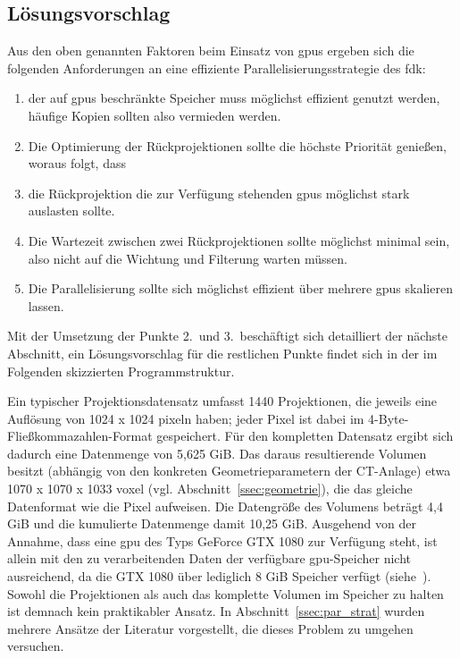 \subsection{Lösungsvorschlag}\label{ssec:loesungsvorschlag}

Aus den oben genannten Faktoren beim Einsatz von \gls{gpu}s ergeben sich die folgenden Anforderungen an eine effiziente
Parallelisierungsstrategie des \gls{fdk}:

\begin{enumerate}
    \item der auf \gls{gpu}s beschränkte Speicher muss möglichst effizient genutzt werden, häufige Kopien sollten also
          vermieden werden.
    \item Die Optimierung der Rückprojektionen sollte die höchste Priorität genießen, woraus folgt, dass
    \item die Rückprojektion die zur Verfügung stehenden \gls{gpu}s möglichst stark auslasten sollte.
    \item Die Wartezeit zwischen zwei Rückprojektionen sollte möglichst minimal sein, also nicht auf die Wichtung und
          Filterung warten müssen.
    \item Die Parallelisierung sollte sich möglichst effizient über mehrere \gls{gpu}s skalieren lassen.
\end{enumerate}

Mit der Umsetzung der Punkte 2.\ und 3.\ beschäftigt sich detailliert der nächste Abschnitt, ein Lösungsvorschlag für
die restlichen Punkte findet sich in der im Folgenden skizzierten Programmstruktur.

Ein typischer Projektionsdatensatz umfasst 1440 Projektionen, die jeweils eine Auflösung von 1024 x 1024 \gls{pixel}n
haben; jeder Pixel ist dabei im 4-Byte-Fließkommazahlen-Format gespeichert. Für den kompletten Datensatz ergibt sich
dadurch eine Datenmenge von 5,625 GiB. Das daraus resultierende Volumen besitzt (abhängig von den konkreten
Geometrieparametern der CT-Anlage) etwa 1070 x 1070 x 1033 \gls{voxel} (vgl. Abschnitt~\ref{ssec:geometrie}), die das
gleiche Datenformat wie die Pixel aufweisen. Die Datengröße des Volumens beträgt 4,4 GiB und die kumulierte Datenmenge
damit 10,25 GiB. Ausgehend von der Annahme, dass eine \gls{gpu} des Typs GeForce{\textregistered} GTX 1080 zur Verfügung
steht, ist allein mit den zu verarbeitenden Daten der verfügbare \gls{gpu}-Speicher nicht ausreichend, da die GTX 1080
über lediglich 8 GiB Speicher verfügt (siehe~\cite{gtx1080}). Sowohl die Projektionen als auch das komplette Volumen im
Speicher zu halten ist demnach kein praktikabler Ansatz. In Abschnitt~\ref{ssec:par_strat} wurden mehrere Ansätze der
Literatur vorgestellt, die dieses Problem zu umgehen versuchen.

